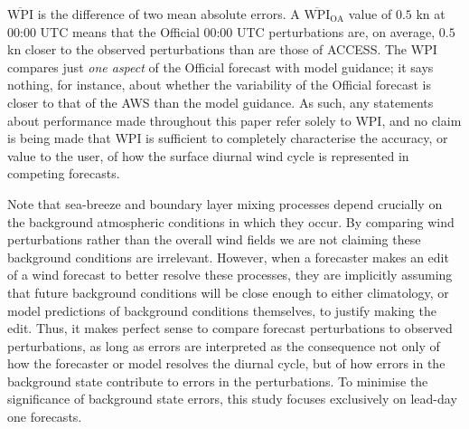 \documentclass{ametsoc}
\begin{document}
$\overline{\text{WPI}}$ is the difference of two mean absolute errors. A $\overline{\text{WPI}}_\text{OA}$ value of $0.5$ kn at 00:00 UTC means that the Official 00:00 UTC perturbations are, on average, $0.5$ kn closer to the observed perturbations than are those of ACCESS. The $\text{WPI}$ compares just \textit{one aspect} of the Official forecast with model guidance; it says nothing, for instance, about whether the variability of the Official forecast is closer to that of the AWS than the model guidance. As such, any statements about performance made throughout this paper refer solely to WPI, and no claim is being made that WPI is sufficient to completely characterise the accuracy, or value to the user, of how the surface diurnal wind cycle is represented in competing forecasts.

Note that sea-breeze and boundary layer mixing processes depend crucially on the background atmospheric conditions in which they occur. By comparing wind perturbations rather than the overall wind fields we are not claiming these background conditions are irrelevant. However, when a forecaster makes an edit of a wind forecast to better resolve these processes, they are implicitly assuming that future background conditions will be close enough to either climatology, or model predictions of background conditions themselves, to justify making the edit. Thus, it makes perfect sense to compare forecast perturbations to observed perturbations, as long as errors are interpreted as the consequence not only of how the forecaster or model resolves the diurnal cycle, but of how errors in the background state contribute to errors in the perturbations. To minimise the significance of background state errors, this study focuses exclusively on lead-day one forecasts.
\end{document}
